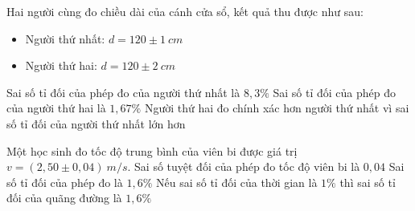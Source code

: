 \begin{ex}%
Hai người cùng đo chiều dài của cánh cửa sổ, kết quả thu được như sau:
\begin{itemize}
\item Người thứ nhất: $d=120 \pm 1 \ cm$
\item Người thứ hai: $d=120 \pm 2 \ cm$
\end{itemize}
{Sai số tỉ đối của phép đo của người thứ nhất là $8,3\%$} 
{\True Sai số tỉ đối của phép đo của người thứ hai là $1,67\%$} 
{Người thứ hai đo chính xác hơn người thứ nhất vì sai số tỉ đối của người thứ nhất lớn hơn} 
\loigiai{ 
\begin{itemchoice}
\itemch
\itemch
\itemch
\itemch
\end{itemchoice}
}
\end{ex}
\begin{ex}%
Một học sinh đo tốc độ trung bình của viên bi được giá trị $v=(2,50 \pm 0,04)\ m/s$.
{\True Sai số tuyệt đối của phép đo tốc độ viên bi là $0,04$} 
{\True Sai số tỉ đối của phép đo là $1,6 \%$} 
{Nếu sai số tỉ đối của thời gian là $1 \%$ thì sai số tỉ đối của quãng đường là $1,6 \%$} 
\loigiai{ 
\begin{itemchoice}
\itemch
\itemch
\itemch
\itemch
\end{itemchoice}
}
\end{ex}


